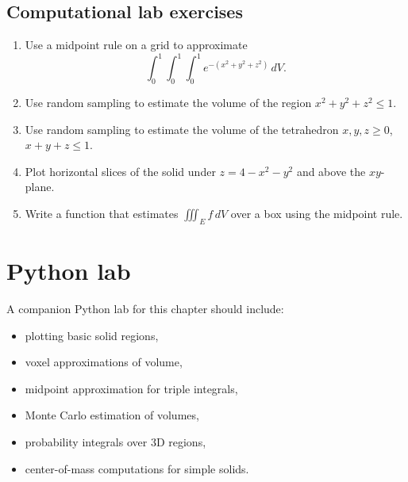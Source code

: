\documentclass[11pt]{article}
\begin{document}
\subsection*{Computational lab exercises}
\begin{enumerate}[start=21]
  \item Use a midpoint rule on a grid to approximate
  \[
  \int_0^1\int_0^1\int_0^1 e^{-(x^2+y^2+z^2)}\,dV.
  \]
  \item Use random sampling to estimate the volume of the region $x^2+y^2+z^2\le1$.
  \item Use random sampling to estimate the volume of the tetrahedron $x,y,z\ge0$, $x+y+z\le1$.
  \item Plot horizontal slices of the solid under $z=4-x^2-y^2$ and above the $xy$-plane.
  \item Write a function that estimates $\iiint_E f\,dV$ over a box using the midpoint rule.
\end{enumerate}

\section*{Python lab}

A companion Python lab for this chapter should include:
\begin{itemize}
  \item plotting basic solid regions,
  \item voxel approximations of volume,
  \item midpoint approximation for triple integrals,
  \item Monte Carlo estimation of volumes,
  \item probability integrals over 3D regions,
  \item center-of-mass computations for simple solids.
\end{itemize}
\end{document}
